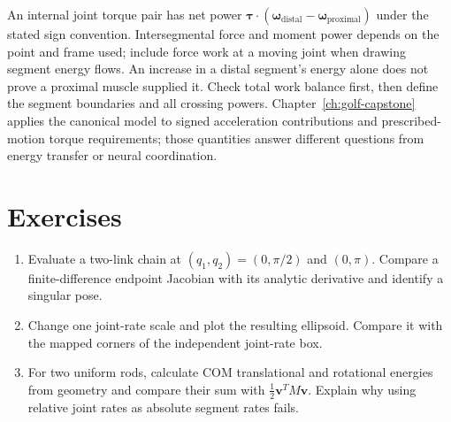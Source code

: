 An internal joint torque pair has net power
$\bm{\tau}\cdot(\bm{\omega}_{\mathrm{distal}}
-\bm{\omega}_{\mathrm{proximal}})$ under the stated sign convention.
Intersegmental force and moment power depends on the point and frame used;
include force work at a moving joint when drawing segment energy flows.
An increase in a distal segment's energy alone does not prove a proximal
muscle supplied it. Check total work balance first, then define the segment
boundaries and all crossing powers. Chapter~\ref{ch:golf-capstone} applies
the canonical model to signed acceleration contributions and prescribed-motion
torque requirements; those quantities answer different questions from energy
transfer or neural coordination.

\section*{Exercises}
\begin{enumerate}
  \item Evaluate a two-link chain at $(q_1,q_2)=(0,\pi/2)$ and
  $(0,\pi)$. Compare a finite-difference endpoint Jacobian with its analytic
  derivative and identify a singular pose.
  \item Change one joint-rate scale and plot the resulting ellipsoid. Compare
  it with the mapped corners of the independent joint-rate box.
  \item For two uniform rods, calculate COM translational and rotational
  energies from geometry and compare their sum with
  $\tfrac12\bm{v}^TM\bm{v}$. Explain why using relative joint rates as
  absolute segment rates fails.
\end{enumerate}
